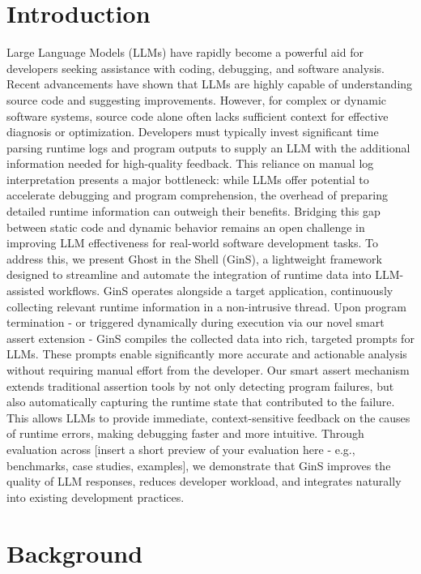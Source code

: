 \documentclass[sigconf]{acmart}
\begin{document}
\section{Introduction}
Large Language Models (LLMs) have rapidly become a powerful aid for developers seeking assistance with coding, debugging, and software analysis. 
Recent advancements have shown that LLMs are highly capable of understanding source code and suggesting improvements. 
However, for complex or dynamic software systems, source code alone often lacks sufficient context for effective diagnosis or optimization. 
Developers must typically invest significant time parsing runtime logs and program outputs to supply an LLM with the additional information needed for high-quality feedback.
This reliance on manual log interpretation presents a major bottleneck: while LLMs offer potential to accelerate debugging and program comprehension, the overhead of preparing detailed runtime information can outweigh their benefits. 
Bridging this gap between static code and dynamic behavior remains an open challenge in improving LLM effectiveness for real-world software development tasks.
To address this, we present Ghost in the Shell (GinS), a lightweight framework designed to streamline and automate the integration of runtime data into LLM-assisted workflows. 
GinS operates alongside a target application, continuously collecting relevant runtime information in a non-intrusive thread. 
Upon program termination - or triggered dynamically during execution via our novel smart assert extension - GinS compiles the collected data into rich, targeted prompts for LLMs. 
These prompts enable significantly more accurate and actionable analysis without requiring manual effort from the developer.
Our smart assert mechanism extends traditional assertion tools by not only detecting program failures, but also automatically capturing the runtime state that contributed to the failure. This allows LLMs to provide immediate, context-sensitive feedback on the causes of runtime errors, making debugging faster and more intuitive.
Through evaluation across [insert a short preview of your evaluation here - e.g., benchmarks, case studies, examples], we demonstrate that GinS improves the quality of LLM responses, reduces developer workload, and integrates naturally into existing development practices.

\section{Background}
\end{document}

